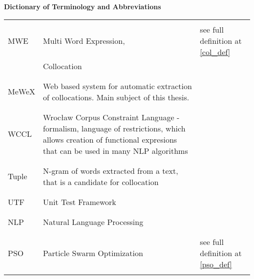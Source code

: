 \textbf{\LARGE Dictionary of Terminology and Abbreviations}

\vspace{1cm}

{\centering
\begin{tabular*}{\textwidth}{L{0.2\textwidth} L{0.5\textwidth} L{0.25\textwidth}}%
    \hline \\
    MWE & Multi Word Expression, & see full definition at \ref{col_def}\\
        & Collocation &  \\
    \\ \hline \\
    MeWeX & Web based system for automatic extraction of collocations. Main subject of this thesis. \\
    \\ \hline \\
    WCCL & Wrocław Corpus Constraint Language - formalism, language of restrictions, which allows creation of functional expresions that can be used in many NLP algorithms \\
    \\ \hline \\
    Tuple & N-gram of words extracted from a text, that is a candidate for collocation \\
    \\ \hline \\
    UTF & Unit Test Framework \\
    \\ \hline \\
    NLP & Natural Language Processing \\
    \\ \hline \\
    PSO & Particle Swarm Optimization & see full definition at \ref{pso_def}\\
    \\\hline
\end{tabular*} }
    